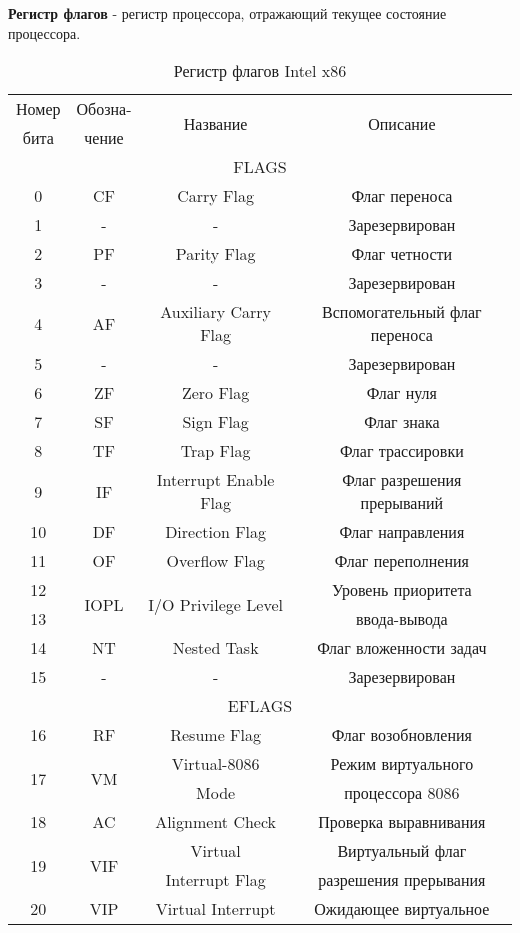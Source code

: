 \textbf{Регистр флагов} - регистр процессора, отражающий текущее состояние процессора.
\begin{table}[h]
\centering
\caption{Регистр флагов Intel x86}
\label{tab:Flags}
\begin{tabular}{|c|c|c|c|}
\hline
Номер & Обозна- & \multirow{2}{*}{Название} & \multirow{2}{*}{Описание} \\
бита & чение & &
\\\hline
\multicolumn{4}{|c|}{FLAGS} \\
\hline
 0 & CF & Carry Flag & Флаг переноса
\\ 1 & - & - & Зарезервирован
\\ 2 & PF & Parity Flag & Флаг четности
\\ 3 & - & - & Зарезервирован
\\ 4 & AF & Auxiliary Carry Flag & Вспомогательный флаг переноса
\\ 5 & - & - & Зарезервирован
\\ 6 & ZF & Zero Flag & Флаг нуля
\\ 7 & SF & Sign Flag & Флаг знака
\\ 8 & TF & Trap Flag & Флаг трассировки
\\ 9 & IF & Interrupt Enable Flag & Флаг разрешения прерываний
\\ 10 & DF & Direction Flag & Флаг направления
\\ 11 & OF & Overflow Flag & Флаг переполнения
\\ 12 & \multirow{2}{*}{IOPL} & \multirow{2}{*}{I/O Privilege Level} & Уровень приоритета
\\ 13 & & &  ввода-вывода
\\ 14 & NT & Nested Task & Флаг вложенности задач
\\ 15 & - & - & Зарезервирован
\\\hline
\multicolumn{4}{|c|}{EFLAGS} \\
\hline
   16 & RF & Resume Flag & Флаг возобновления
\\ \multirow{2}{*}{17} & \multirow{2}{*}{VM} & Virtual-8086 & Режим виртуального
\\ & & Mode & процессора 8086
\\ 18 & AC & Alignment Check & Проверка выравнивания
\\ \multirow{2}{*}{19} &  \multirow{2}{*}{VIF} & Virtual & Виртуальный флаг
\\ & & Interrupt Flag & разрешения прерывания
\\ \multirow{2}{*}{20} & \multirow{2}{*}{VIP} & Virtual Interrupt & Ожидающее виртуальное

\end{tabular}
\end{table}
